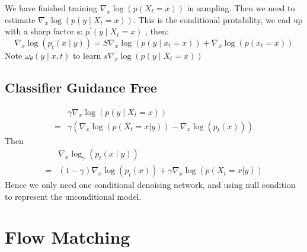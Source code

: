 \documentclass{article}
\begin{document}
    
We have finished training  $\nabla_{x} \log \left(p\left(X_{t}=x\right)\right)$  in sampling. Then we need to estimate  $\nabla_{x} \log \left(p\left(y \mid X_{t}=x\right)\right)$. This is the conditional protability, we end up with a sharp factor s: $p^{\prime}\left(y \mid X_{t}=x\right)$ , then:
\begin{equation}
    \nabla_{x} \log \left(p_{t}(x \mid y)\right)=S \nabla_{x} \log \left(p\left(y \mid x_{t}=x\right)\right)+\nabla_{x} \log \left(p\left(x_{t}=x\right)\right)
\end{equation}
Note  $\omega_{\theta}(y \mid x, t)$  to learn  $s \nabla_{x} \log \left(p\left(y \mid X_{t}=x\right)\right)$ 

\subsection{Classifier Guidance Free}
\begin{equation}
    \begin{aligned}
        &\gamma \nabla_{x} \log \left(p\left(y \mid X_{t}=x\right)\right)\\
         =& \gamma\left(\nabla_x \log \left(p(X_t=x|y)\right) - \nabla_x \log \left(p_t(x)\right)\right)
    \end{aligned}
\end{equation}
Then 
\begin{equation}
    \begin{aligned}
        &\nabla_{x} \log_\gamma \left(p_{t}(x \mid y)\right)\\
        =&(1-\gamma)\nabla_x \log \left(p_t(x)\right) + \gamma\nabla_x \log \left(p(X_t=x|y)\right)
    \end{aligned}
\end{equation}
Hence we only need one conditional denoising network, and using null condition to represent the unconditional model.


\section{Flow Matching}
\end{document}

